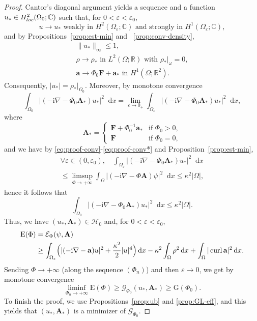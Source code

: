 \documentclass[10pt,a4paper]{amsart}
\newcommand{\Ab}{\mathbf A}
\newcommand{\C}{\mathbb C}
\newcommand{\Ef}{\mathcal E_\Phi}
\newcommand{\En}{\mathrm E(\Phi)}
\newcommand{\Fb}{\mathbf F}
\newcommand{\R}{\mathbb R}
\newcommand{\ab}{\mathbf a}
\newcommand{\cG}{\mathcal G}
\newcommand{\cH}{\mathcal H}
\DeclareMathOperator{\curl}{curl}
\newcommand{\dd}{\mathop{}\!{\mathrm d}}
\newcommand{\ii}{\mathrm i}
\newcommand{\rG}{\mathrm G}
\begin{document}
\begin{proof}
Cantor's diagonal argument yields a sequence  and a  function $u_*\in H^2_{\rm loc}(\Omega_0;\C)$ such that,  for $0<\varepsilon<\varepsilon_0$,
\begin{equation}\label{eq:proof-conv}
 u\to u_*\text{ weakly in }H^2(\Omega_\varepsilon;\C) \mbox{ and strongly in }H^1(\Omega_\varepsilon;\C),\end{equation}
and by Propositions~\ref{prop:est-min} and ~\ref{prop:conv-density},
\begin{equation}\label{eq:proof-conv*}
\begin{gathered}
\|u_*\|_\infty\leq 1,\\
\rho\to \rho_*\text{ in }L^2(\Omega;\R)\text{ with }\rho_*|_{\omega}=0,\\
\ab\to \Phi_0\Fb+\ab_*\text{ in }H^1(\Omega;\R^2).
\end{gathered}
\end{equation}
Consequently,  $|u_*|=\rho_*|_{\Omega_0}$.  Moreover, by monotone convergence
\[\int_{\Omega_0}|(-\ii\nabla-\Phi_0\Ab_*)u_*|^2\dd x=\lim_{\varepsilon\to0_+}\int_{\Omega_\varepsilon}|(-\ii\nabla-\Phi_0\Ab_*)u_*|^2\dd x, \]
where
\[\Ab_*=\begin{cases}\Fb+\Phi_0^{-1}\ab_*&\text{if }\Phi_0>0,\\
\Fb&\text{if }\Phi_0=0,\end{cases}\]
and we have by \eqref{eq:proof-conv}-\eqref{eq:proof-conv*} and Proposition~\ref{prop:est-min},
\begin{multline*}\forall\varepsilon\in(0,\varepsilon_0),\quad \int_{\Omega_\varepsilon}|(-\ii\nabla-\Phi_0\Ab_*)u_*|^2\dd x\\
\leq \limsup_{\Phi\to+\infty}\int_{\Omega}|(-\ii\nabla-\Phi\Ab)\psi|^2\dd x\leq \kappa^2|\Omega|,\end{multline*}
hence it follows that
\[\int_{\Omega_0}|(-\ii\nabla-\Phi_0\Ab_*)u_*|^2\dd x \leq \kappa^2|\Omega|.\]
 Thus, we have $(u_*,\Ab_*)\in\cH_0$ and, for $0<\varepsilon<\varepsilon_0$,
\[\begin{aligned}
\En&=\Ef(\psi,\Ab)\\
&\geq \int_{\Omega_\varepsilon}\Bigl(|(-\ii\nabla-\ab)u|^2+\frac{\kappa^2}2|u|^4\Bigr)\dd x-\kappa^2\int_{\Omega}\rho^2\dd x+\int_\Omega|\curl\ab|^2\dd x .
\end{aligned}\]
Sending $\Phi\to+\infty$ (along the sequence $(\Phi_n)$) and then $\varepsilon\to0$, we get by monotone convergence
\[\liminf_{\Phi_n\to+\infty}\En\geq \cG_{\Phi_0}(u_*,\Ab_*)\geq \rG(\Phi_0).\]
To finish the proof, we use Propositions~\ref{prop:ub} and \ref{prop:GL-eff}, and this yields that $(u_*,\Ab_*)$ is a minimizer of $\cG_{\Phi_0}$.
\end{proof}
\end{document}
